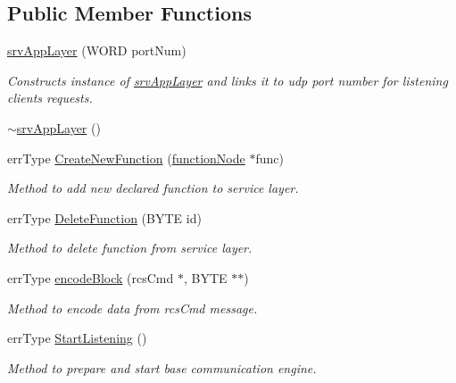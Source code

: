 \subsection*{Public Member Functions}
\begin{DoxyCompactItemize}
\item 
\hyperlink{classsrvAppLayer_a526a72df150984ef1a0f31bd9777bcc6}{srvAppLayer} (WORD portNum)
\begin{DoxyCompactList}\small\item\em Constructs instance of \hyperlink{classsrvAppLayer}{srvAppLayer} and links it to udp port number for listening clients requests. \item\end{DoxyCompactList}\item 
\hyperlink{classsrvAppLayer_a9b9bc06db46f6721d716dd4ed80050c4}{$\sim$srvAppLayer} ()
\item 
errType \hyperlink{classsrvAppLayer_a1027b7713e6a615afdef15691761ed51}{CreateNewFunction} (\hyperlink{classfunctionNode}{functionNode} $\ast$func)
\begin{DoxyCompactList}\small\item\em Method to add new declared function to service layer. \item\end{DoxyCompactList}\item 
errType \hyperlink{classsrvAppLayer_a32146884e8877f567f7ecaa7a1def074}{DeleteFunction} (BYTE id)
\begin{DoxyCompactList}\small\item\em Method to delete function from service layer. \item\end{DoxyCompactList}\item 
errType \hyperlink{classsrvAppLayer_ac045ddd0cab4621e0cfa2f8b15c9e77c}{encodeBlock} (rcsCmd $\ast$, BYTE $\ast$$\ast$)
\begin{DoxyCompactList}\small\item\em Method to encode data from rcsCmd message. \item\end{DoxyCompactList}\item 
errType \hyperlink{classsrvAppLayer_acde5f9e1287ca5206957c64354d1aa8f}{StartListening} ()
\begin{DoxyCompactList}\small\item\em Method to prepare and start base communication engine. \item\end{DoxyCompactList}\item 
$$
\end{DoxyCompactItemize}

